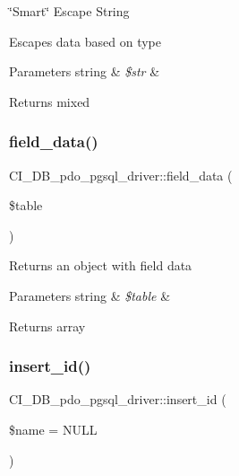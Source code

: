 \char`\"{}\+Smart\char`\"{} Escape String

Escapes data based on type


\begin{DoxyParams}[1]{Parameters}
string & {\em \$str} & \\
\hline
\end{DoxyParams}
\begin{DoxyReturn}{Returns}
mixed 
\end{DoxyReturn}
\mbox{\label{class_c_i___d_b__pdo__pgsql__driver_a8a0b783e3b1e4bd40862b749fd3dd9b5}} 
\subsubsection{\texorpdfstring{field\+\_\+data()}{field\_data()}}
{\footnotesize\ttfamily C\+I\+\_\+\+D\+B\+\_\+pdo\+\_\+pgsql\+\_\+driver\+::field\+\_\+data (\begin{DoxyParamCaption}\item[{}]{\$table }\end{DoxyParamCaption})}

Returns an object with field data


\begin{DoxyParams}[1]{Parameters}
string & {\em \$table} & \\
\hline
\end{DoxyParams}
\begin{DoxyReturn}{Returns}
array 
\end{DoxyReturn}
\mbox{\label{class_c_i___d_b__pdo__pgsql__driver_a5cc6768067380882e7153de420221155}} 
\subsubsection{\texorpdfstring{insert\+\_\+id()}{insert\_id()}}
{\footnotesize\ttfamily C\+I\+\_\+\+D\+B\+\_\+pdo\+\_\+pgsql\+\_\+driver\+::insert\+\_\+id (\begin{DoxyParamCaption}\item[{}]{\$name = {\ttfamily NULL} }\end{DoxyParamCaption})}

